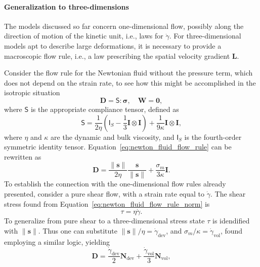 \paragraph{Generalization to three-dimensions}
The models discussed so far concern one-dimensional flow, possibly along the direction of motion of the kinetic unit, i.e., laws for $\dot \gamma$.
For three-dimensional models apt to describe large deformations, it is necessary to provide a macroscopic flow rule, i.e., a law prescribing the spatial velocity gradient $\mathbf L$.

Consider the flow rule for the Newtonian fluid without the pressure term, which does not depend on the strain rate, to see how this might be accomplished in the isotropic situation
\begin{equation}
	\label{eq:newton_fluid_flow_rule}
	\mathbf D = \bm{\mathsf S}: \bm \sigma,\quad \mathbf W = \bm 0,
\end{equation}
where $\bm{\mathsf S}$ is the appropriate compliance tensor, defined as
\begin{equation}
	\bm{\mathsf S} = \frac{1}{2\eta} \left(\bm{\mathsf I}_S - \frac{1}{3} \mathbf I\otimes\mathbf I\right) + \frac{1}{9\kappa} \mathbf I\otimes \mathbf I,
\end{equation}
where $\eta$ and $\kappa$ are the dynamic and bulk viscosity, and $\bm{\mathsf I}_S$ is the fourth-order symmetric identity tensor.
Equation~\eqref{eq:newton_fluid_flow_rule} can be rewritten as
\begin{equation}
	\label{eq:newton_fluid_flow_rule_norm}
	\mathbf D = \frac{\|\mathbf s\|}{2 \eta} \frac{\mathbf s}{\|\mathbf s\|} + \frac{\sigma_m}{3\kappa} \mathbf I.
\end{equation}
To establish the connection with the one-dimensional flow rules already presented, consider a pure shear flow, with a strain rate equal to $\dot \gamma$.
The shear stress found from Equation~\eqref{eq:newton_fluid_flow_rule_norm} is
\begin{equation}
	\tau = \eta \dot\gamma.
\end{equation}
To generalize from pure shear to a three-dimensional stress state $\tau$ is idendified with $\|\mathbf s\|$.
Thus one can substitute $\|\mathbf s\|/\eta = \dot\gamma_\text{dev}$, and $\sigma_m /\kappa = \dot\gamma_\text{vol}$, found employing a similar logic, yielding
\begin{equation}
	\mathbf D = \frac{\dot \gamma_\text{dev} }{2} \mathbf N_\text{dev} + \frac{\dot\gamma_\text{vol} }{3} \mathbf N_\text{vol},
\end{equation}
